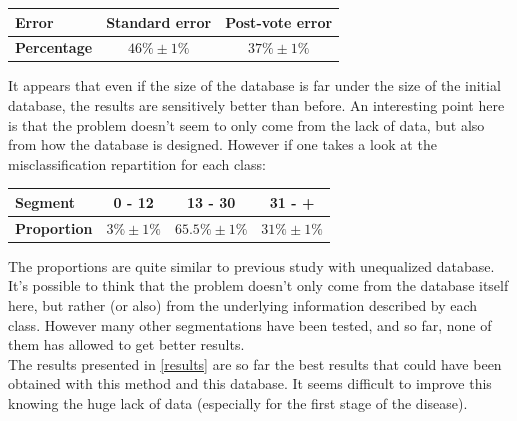 \documentclass{report}
\begin{document}
	\vspace{0.5cm}
	\begin{center}
		\begin{tabular}{|l|c|c|}
			\hline \textbf{Error} & \textbf{Standard error} & \textbf{Post-vote error}\\
			\hline \textbf{Percentage} & $46\% \pm 1\%$ & $37\% \pm 1\%$\\
			\hline
		\end{tabular}
	\end{center}
	\vspace{0.5cm}
	
	It appears that even if the size of the database is far under the size of the initial database, the results are sensitively better than before. An interesting point here is that the problem doesn't seem to only come from the lack of data, but also from how the database is designed. However if one takes a look at the misclassification repartition for each class:
	
	\vspace{0.5cm}
	\begin{center}
		\begin{tabular}{|l|c|c|c|}
			\hline \textbf{Segment} & \textbf{0 - 12} & \textbf{13 - 30} & \textbf{31 - +}\\
			\hline \textbf{Proportion} & $3\% \pm 1\%$ & $65.5\% \pm 1\%$ & $31\% \pm 1\%$ \\
			\hline
		\end{tabular}
		\label{results}
	\end{center}
	\vspace{0.5cm}
	
	The proportions are quite similar to previous study with unequalized database. It's possible to think that the problem doesn't only come from the database itself here, but rather (or also) from the underlying information described by each class. However many other segmentations have been tested, and so far, none of them has allowed to get better results. \\
	
	The results presented in \ref{results} are so far the best results that could have been obtained with this method and this database. It seems difficult to improve this knowing the huge lack of data (especially for the first stage of the disease). 
	
\end{document}
